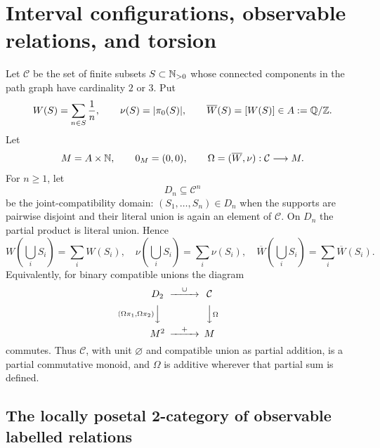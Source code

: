 \section{Interval configurations, observable relations, and torsion}
\label{sec:states-filtration}

Let $\mathcal C$ be the set of finite subsets $S\subset\mathbb N_{>0}$ whose connected components in the path graph have cardinality $2$ or $3$.  Put
\begin{equation}\label{eq:observations}
W(S)=\sum_{n\in S}\frac1n,
\qquad
\nu(S)=|\pi_0(S)|,
\qquad
\overline W(S)=[W(S)]\in A:=\mathbb Q/\mathbb Z.
\end{equation}
Let
\[
M=A\times\mathbb N,
\qquad
0_M=(0,0),
\qquad
\Omega=(\overline W,\nu):\mathcal C\longrightarrow M.
\]
For $n\ge1$, let
\[
D_n\subseteq\mathcal C^n
\]
be the joint-compatibility domain: $(S_1,\ldots,S_n)\in D_n$ when the supports are pairwise disjoint and their literal union is again an element of $\mathcal C$.  On $D_n$ the partial product is literal union.  Hence
\begin{equation}\label{eq:additive-observations}
W\!\left(\bigcup_iS_i\right)=\sum_iW(S_i),
\quad
\nu\!\left(\bigcup_iS_i\right)=\sum_i\nu(S_i),
\quad
\overline W\!\left(\bigcup_iS_i\right)=\sum_i\overline W(S_i).
\end{equation}
Equivalently, for binary compatible unions the diagram
\begin{equation}\label{eq:observation-square}
\begin{CD}
D_2 @>{\cup}>> \mathcal C\\
@V{(\Omega\pi_1,\Omega\pi_2)}VV @VV{\Omega}V\\
M^2 @>{+}>> M
\end{CD}
\end{equation}
commutes.  Thus $\mathcal C$, with unit $\varnothing$ and compatible union as partial addition, is a partial commutative monoid, and $\Omega$ is additive wherever that partial sum is defined.

\subsection{The locally posetal 2-category of observable labelled relations}

